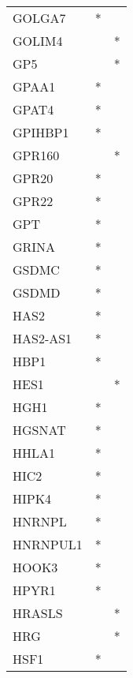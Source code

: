 \begin{longtable}{lcc}
GOLGA7           &              * &            \\
GOLIM4           &                &          * \\
GP5              &                &          * \\
GPAA1            &              * &            \\
GPAT4            &              * &            \\
GPIHBP1          &              * &            \\
GPR160           &                &          * \\
GPR20            &              * &            \\
GPR22            &              * &            \\
GPT              &              * &            \\
GRINA            &              * &            \\
GSDMC            &              * &            \\
GSDMD            &              * &            \\
HAS2             &              * &            \\
HAS2-AS1         &              * &            \\
HBP1             &              * &            \\
HES1             &                &          * \\
HGH1             &              * &            \\
HGSNAT           &              * &            \\
HHLA1            &              * &            \\
HIC2             &              * &            \\
HIPK4            &              * &            \\
HNRNPL           &              * &            \\
HNRNPUL1         &              * &            \\
HOOK3            &              * &            \\
HPYR1            &              * &            \\
HRASLS           &                &          * \\
HRG              &                &          * \\
HSF1             &              * &            \\

\end{longtable}
